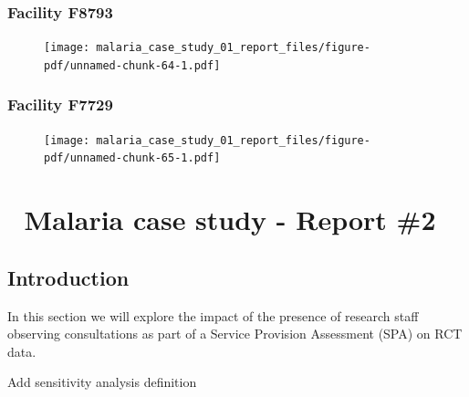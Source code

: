 \documentclass[
  letterpaper,
  DIV=11,
  numbers=noendperiod,
  oneside]{scrreprt}
\begin{document}
\hypertarget{facility-f8793}{%
\subsection{Facility F8793}\label{facility-f8793}}

\begin{figure}

\texttt{[image: malaria\_case\_study\_01\_report\_files/figure-pdf/unnamed-chunk-64-1.pdf]}

\end{figure}

\hypertarget{facility-f7729}{%
\subsection{Facility F7729}\label{facility-f7729}}

\begin{figure}

\texttt{[image: malaria\_case\_study\_01\_report\_files/figure-pdf/unnamed-chunk-65-1.pdf]}

\end{figure}

\hypertarget{malaria-case-study---report-2}{%
\chapter{\texorpdfstring{{📙} Malaria case study - Report
\#2}{📙 Malaria case study - Report \#2}}\label{malaria-case-study---report-2}}

\hypertarget{introduction-13}{%
\section{Introduction}\label{introduction-13}}

In this section we will explore the impact of the presence of research
staff observing consultations as part of a Service Provision Assessment
(SPA) on RCT data.

\begin{tcolorbox}[enhanced jigsaw, coltitle=black, opacityback=0, title=\textcolor{quarto-callout-note-color}{\faInfo}\hspace{0.5em}{Note}, toprule=.15mm, bottomtitle=1mm, colbacktitle=quarto-callout-note-color!10!white, colframe=quarto-callout-note-color-frame, left=2mm, opacitybacktitle=0.6, bottomrule=.15mm, arc=.35mm, toptitle=1mm, colback=white, titlerule=0mm, breakable, leftrule=.75mm, rightrule=.15mm]

Add sensitivity analysis definition

\end{tcolorbox}
\end{document}
